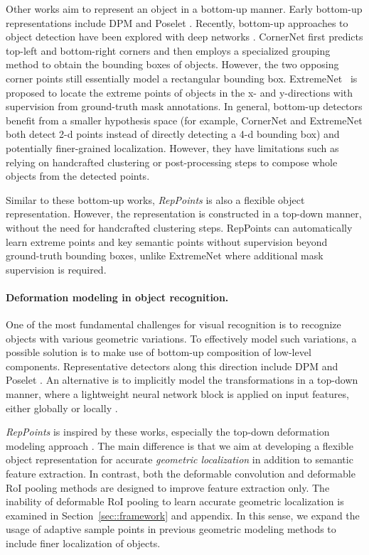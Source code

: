 \documentclass[10pt,twocolumn,letterpaper]{article}
\begin{document}
Other works aim to represent an object in a bottom-up manner. Early bottom-up representations include DPM \cite{felzenszwalb2010object} and Poselet \cite{bourdev2010detecting}. Recently, bottom-up approaches to object detection have been explored with deep networks \cite{CornerNet,ExtremeNet}. CornerNet \cite{CornerNet} first predicts top-left and bottom-right corners and then employs a specialized grouping method \cite{newell2017associative} to obtain the bounding boxes of objects. However, the two opposing corner points still essentially model a rectangular bounding box. ExtremeNet~\cite{ExtremeNet} is proposed to locate the extreme points of objects in the x- and y-directions \cite{papadopoulos2017extreme} with supervision from ground-truth mask annotations. In general, bottom-up detectors benefit from a smaller hypothesis space (for example, CornerNet and ExtremeNet both detect 2-d points instead of directly detecting a 4-d bounding box) and potentially finer-grained localization. However, they have limitations such as relying on handcrafted clustering or post-processing steps to compose whole objects from the detected points.

Similar to these bottom-up works, \textit{RepPoints} is also a flexible object representation. However, the representation is constructed in a top-down manner, without the need for handcrafted clustering steps. RepPoints can automatically learn extreme points and key semantic points without supervision beyond ground-truth bounding boxes, unlike ExtremeNet \cite{ExtremeNet} where additional mask supervision is required.

\vspace{-10pt}
\paragraph{Deformation modeling in object recognition.} One of the most fundamental challenges for visual recognition is to recognize objects with various geometric variations. To effectively model such variations, a possible solution is to make use of bottom-up composition of low-level components. Representative detectors along this direction include DPM \cite{felzenszwalb2010object} and Poselet \cite{bourdev2010detecting}. An alternative is to implicitly model the transformations in a top-down manner, where a lightweight neural network block is applied on input features, either globally \cite{STN} or locally \cite{DCN}.

\textit{RepPoints} is inspired by these works, especially the top-down deformation modeling approach \cite{DCN}. The main difference is that we aim at developing a flexible object representation for accurate \emph{geometric localization} in addition to semantic feature extraction. 
In contrast, both the deformable convolution and deformable RoI pooling methods are designed to improve feature extraction only. The inability of deformable RoI pooling to learn accurate geometric localization is examined in Section~\ref{sec::framework} and appendix.
In this sense, we expand the usage of adaptive sample points in previous geometric modeling methods \cite{STN,DCN} to include finer localization of objects.
\end{document}
